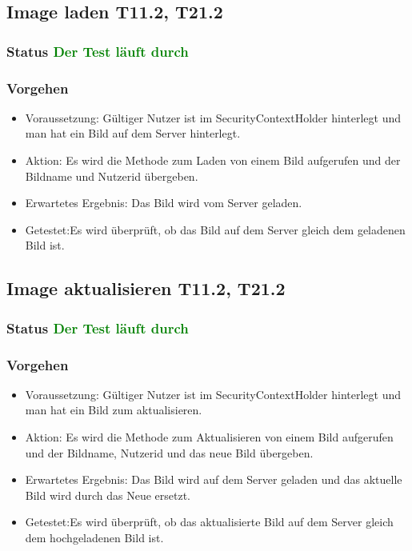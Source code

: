 \subsection{Image laden T11.2, T21.2}
\subsubsection{Status \textcolor{green}{ Der Test läuft durch} }
\subsubsection{Vorgehen}
\begin{itemize}
	\item Voraussetzung: Gültiger Nutzer ist im SecurityContextHolder hinterlegt und man hat ein Bild auf dem Server hinterlegt.
	\item Aktion: Es wird die Methode zum Laden von einem Bild aufgerufen und der Bildname und Nutzerid übergeben. 
	\item Erwartetes Ergebnis: Das Bild wird vom Server geladen.
	\item Getestet:Es wird überprüft, ob das Bild auf dem Server gleich dem geladenen Bild ist.
\end{itemize}

\subsection{Image aktualisieren T11.2, T21.2}
\subsubsection{Status \textcolor{green}{ Der Test läuft durch} }
\subsubsection{Vorgehen}
\begin{itemize}
	\item Voraussetzung: Gültiger Nutzer ist im SecurityContextHolder hinterlegt und man hat ein Bild zum aktualisieren.
	\item Aktion: Es wird die Methode zum Aktualisieren von einem Bild aufgerufen und der Bildname, Nutzerid und das neue Bild übergeben. 
	\item Erwartetes Ergebnis: Das Bild wird auf dem Server geladen und das aktuelle Bild wird durch das Neue ersetzt.
	\item Getestet:Es wird überprüft, ob das aktualisierte Bild auf dem Server gleich dem hochgeladenen Bild ist.
\end{itemize}

